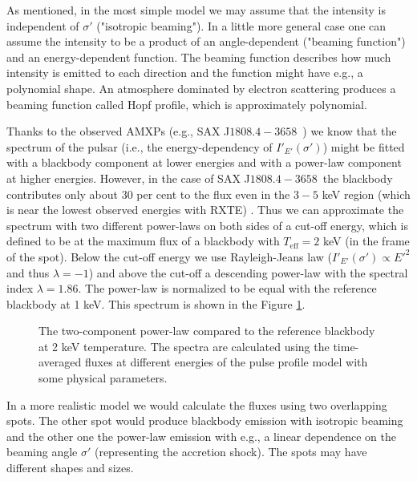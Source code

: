 \documentclass{wihuri}
\def\Dop{\delta}
\def\source{SAX J$1808.4-3658$}
\begin{document}

As mentioned, in the most simple model we may assume that the intensity is independent of $\sigma'$ ("isotropic beaming"). In a little more general case one can assume the intensity to be a product of an angle-dependent ("beaming function") and an energy-dependent function. The beaming function describes how much intensity is emitted to each direction and the function might have e.g., a polynomial shape. An atmosphere dominated by electron scattering produces a beaming function called Hopf profile, which is approximately polynomial.  


Thanks to the observed AMXPs (e.g., \source \ \cite{poutagierlinskisax}) we know that the spectrum of the pulsar (i.e., the energy-dependency of $I'_{E'}(\sigma')$) might be fitted with a blackbody component at lower energies and with a power-law component at higher energies. However, in the case of \source \ the blackbody contributes only about $30$ per cent to the flux even in the $3-5$ keV region (which is near the lowest observed energies with RXTE) \cite{poutagierlinskisax}. Thus we can approximate the spectrum with two different power-laws on both sides of a cut-off energy, which is defined to be at the maximum flux of a blackbody with $T_{\mathrm{eff}} = 2 $ keV (in the frame of the spot). Below the cut-off energy we use Rayleigh-Jeans law ($I'_{E'}(\sigma') \propto E '^{2}$ and thus $\lambda = -1$) and above the cut-off a descending power-law with the spectral index $\lambda = 1.86$. The power-law is normalized to be equal with the reference blackbody at 1 keV. This spectrum is shown in the Figure \ref{fig:spectrum}.


\begin{figure}
\centerline{}
\caption{The two-component power-law compared to the reference blackbody at 2 keV temperature. The spectra are calculated using the time-averaged fluxes at different energies of the pulse profile model with some physical parameters. 
\label{fig:spectrum}}
\end{figure}


In a more realistic model we would calculate the fluxes using two overlapping spots. The other spot would produce blackbody emission with isotropic beaming and the other one the power-law emission with e.g., a linear dependence on the beaming angle $\sigma'$ (representing the accretion shock). The spots may have different shapes and sizes. %
\end{document}
